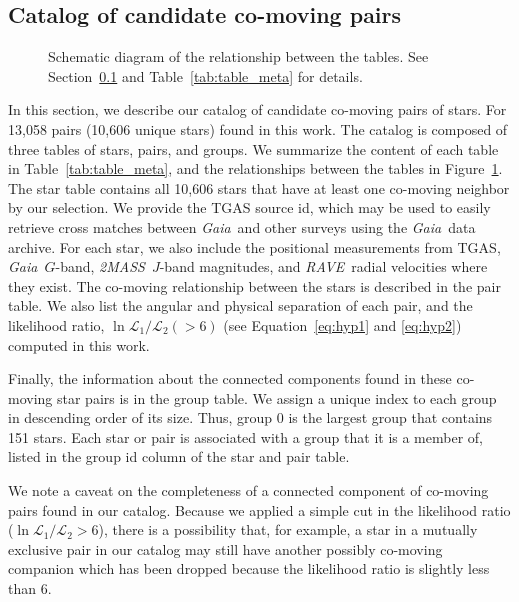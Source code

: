 \documentclass[manuscript, letterpaper]{aastex6}
\newcommand{\project}[1]{\textsl{#1}}
\newcommand{\acronym}[1]{{\small{#1}}}
\newcommand{\gaia}{\project{Gaia}}
\newcommand{\rave}{\project{\acronym{RAVE}}}
\newcommand{\tmass}{\project{\acronym{2MASS}}}
\newcommand{\sectionname}{Section}
\newcommand{\eqname}{Equation}
\newcommand{\tgas}{\acronym{TGAS}}
\begin{document}
\subsection{Catalog of candidate co-moving pairs}
\label{sub:catalog}



\begin{figure}[htbp]
  \centering
  
  \caption{Schematic diagram of the relationship between the tables.
    See \sectionname~\ref{sub:catalog} and Table~\ref{tab:table_meta} for details.
    \label{fig:schema}}
\end{figure}

In this section, we describe our catalog of candidate co-moving pairs of stars.
For 13,058 pairs (10,606 unique stars) found in this work.
The catalog is composed of three tables of stars, pairs, and groups.
We summarize the content of each table in Table~\ref{tab:table_meta}, and
the relationships between the tables in Figure~\ref{fig:schema}.
The star table contains all 10,606 stars that have at least one co-moving neighbor
by our selection. We provide the TGAS source id, which may be used to easily
retrieve cross matches between \gaia\ and other surveys
using the \gaia\ data archive.
For each star, we also include the positional measurements from \tgas,
\gaia\ $G$-band, \tmass\ $J$-band magnitudes, and
\rave\ radial velocities where they exist.
The co-moving relationship between the stars is described in the pair table.
We also list the angular and physical separation of each pair, and the likelihood ratio,
$\ln \mathcal{L}_1 /\mathcal{L}_2(>6)$ (see \eqname~\ref{eq:hyp1} and \ref{eq:hyp2})
computed in this work.

Finally, the information about the connected components found in these co-moving
star pairs is in the group table. We assign a unique index to each group
in descending order of its size. Thus, group 0 is the largest group
that contains 151 stars.
Each star or pair is associated with a group that it is a member of, listed
in the group id column of the star and pair table.

We note a caveat on the completeness of a connected component of co-moving
pairs found in our catalog. Because we applied a simple cut in the likelihood
ratio ($\ln \mathcal{L}_1 /\mathcal{L}_2>6$), there is a possibility that, for
example, a star in a mutually exclusive pair in our catalog may still have
another possibly co-moving companion which has been dropped because the
likelihood ratio is slightly less than 6.
\end{document}

